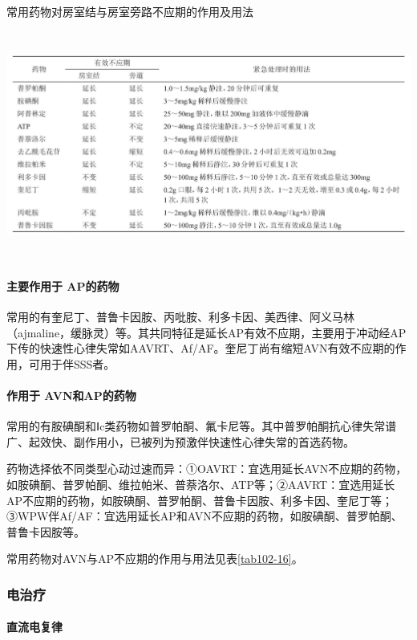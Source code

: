\begin{table}[htbp]
\centering
\caption{常用药物对房室结与房室旁路不应期的作用及用法}
\label{tab102-16}
\includegraphics[width=6.65625in,height=2.95833in]{./images/Image00452.jpg}
\end{table}

\paragraph{主要作用于 AP的药物}

常用的有奎尼丁、普鲁卡因胺、丙吡胺、利多卡因、美西律、阿义马林（ajmaline，缓脉灵）等。其共同特征是延长AP有效不应期，主要用于冲动经AP下传的快速性心律失常如AAVRT、Af/AF。奎尼丁尚有缩短AVN有效不应期的作用，可用于伴SSS者。

\paragraph{作用于 AVN和AP的药物}

常用的有胺碘酮和Ⅰc类药物如普罗帕酮、氟卡尼等。其中普罗帕酮抗心律失常谱广、起效快、副作用小，已被列为预激伴快速性心律失常的首选药物。

药物选择依不同类型心动过速而异：①OAVRT：宜选用延长AVN不应期的药物，如胺碘酮、普罗帕酮、维拉帕米、普萘洛尔、ATP等；②AAVRT：宜选用延长AP不应期的药物，如胺碘酮、普罗帕酮、普鲁卡因胺、利多卡因、奎尼丁等；③WPW伴Af/AF：宜选用延长AP和AVN不应期的药物，如胺碘酮、普罗帕酮、普鲁卡因胺等。

常用药物对AVN与AP不应期的作用与用法见表\ref{tab102-16}。

\subsubsection{电治疗}

\paragraph{直流电复律}

